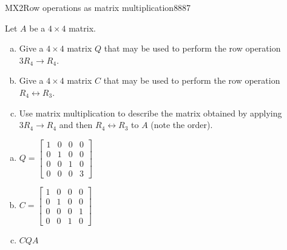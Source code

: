 \begin{exercise}{MX2}{Row operations as matrix multiplication}{8887} 
\begin{exerciseStatement} 

Let \(A\) be a \(4 \times 4\) matrix.

 

\begin{enumerate}[(a)]
\item Give a \(4 \times 4\) matrix \(Q\) that may be used to perform the row operation \(3 R_4 \to R_4\).
\item Give a \(4 \times 4\) matrix \(C\) that may be used to perform the row operation \(R_4 \leftrightarrow R_3\).
\item Use matrix multiplication to describe the matrix obtained by applying \(3 R_4 \to R_4\) and then \(R_4 \leftrightarrow R_3\) to \(A\) (note the order). 
\end{enumerate}

     \end{exerciseStatement}
 \begin{exerciseAnswer} 

\begin{enumerate}[(a)]
\item \(Q=\left[\begin{array}{cccc}
1 & 0 & 0 & 0 \\
0 & 1 & 0 & 0 \\
0 & 0 & 1 & 0 \\
0 & 0 & 0 & 3
\end{array}\right]\)
\item \(C=\left[\begin{array}{cccc}
1 & 0 & 0 & 0 \\
0 & 1 & 0 & 0 \\
0 & 0 & 0 & 1 \\
0 & 0 & 1 & 0
\end{array}\right]\)
\item  \(CQA\) 
\end{enumerate}

     \end{exerciseAnswer}
 \end{exercise}


